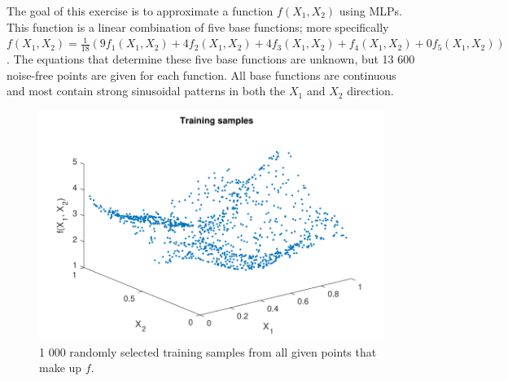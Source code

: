 \documentclass[a4, 10pt, twoside, twocolumn]{article}
\numberwithin{figure}{section}
\begin{document}
The goal of this exercise is to approximate a function $f(X_1, X_2)$ using MLPs. This function is a linear combination of five base functions; more specifically $f(X_1, X_2) = \frac{1}{18}(9f_1(X_1, X_2) + 4f_2(X_1, X_2) + 4f_3(X_1, X_2) + f_4(X_1, X_2) + 0f_5(X_1, X_2))$. The equations that determine these five base functions are unknown, but 13 600 noise-free points are given for each function. All base functions are continuous and most contain strong sinusoidal patterns in both the $X_1$ and $X_2$ direction.

\begin{figure}[ht]
    \includegraphics[width=\linewidth]{img/TrainPoints.pdf}
    \caption{1 000 randomly selected training samples from all given points that make up $f$.}
    \label{fig:TrainPoints}
\end{figure}

\end{document}
